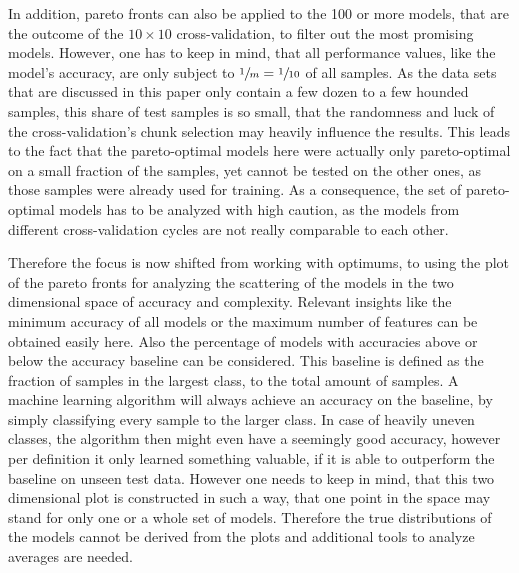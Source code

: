 In addition, pareto fronts can also be applied to the 100 or more models, that are the outcome of the
\(10 \times 10\) cross-validation, to filter out the most promising models.
However, one has to keep in mind, that all performance values, like the model's accuracy,
are only subject to \(\sfrac{1}{m} = \sfrac{1}{10}\) of all samples.
As the data sets that are discussed in this paper only contain a few dozen to a few hounded
samples, this share of test samples is so small, that the randomness and luck of
the cross-validation's chunk selection may heavily influence the results.
This leads to the fact that the pareto-optimal models here were actually only pareto-optimal on
a small fraction of the samples, yet cannot be tested on the other ones, as those samples were already used for training.
As a consequence, the set of pareto-optimal models has to be analyzed with high caution,
as the models from different cross-validation cycles are not really comparable to each other.

Therefore the focus is now shifted from working with optimums, to using the plot of the pareto fronts
for analyzing the scattering of the models in the two dimensional space of accuracy and complexity.
Relevant insights like the minimum accuracy of all models or the maximum number of features can be obtained easily here.
Also the percentage of models with accuracies above or below the accuracy baseline can be considered.
This baseline is defined as the fraction of samples in the largest class, to the total amount of samples.
A machine learning algorithm will always achieve an accuracy on the baseline, by simply classifying every sample to the larger class.
In case of heavily uneven classes, the algorithm then might even have a seemingly good accuracy,
however per definition it only learned something valuable, if it is able to outperform the baseline on unseen test data.
However one needs to keep in mind, that this two dimensional plot is constructed in such a way,
that one point in the space may stand for only one or a whole set of models.
Therefore the true distributions of the models cannot be derived from the plots and additional tools to analyze averages are needed.

